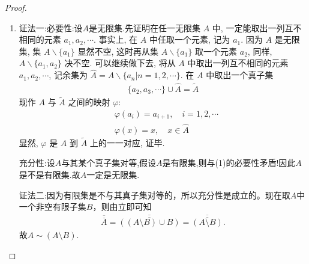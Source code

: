 \documentclass[../../main.tex]{subfiles}%
\begin{document}
\begin{proof}
\begin{enumerate}[(1)]
\item {\color{blue}证法一:}{\heiti 必要性:}设$A$是无限集.先证明在任一无限集 $A$ 中, 一定能取出一列互不相同的元素 $a_1, a_2, \cdots$. 事实上, 在 $A$ 中任取一个元素, 记为 $a_1$. 因为 $A$ 是无限集, 集 $A\backslash  \{a_1\}$ 显然不空, 这时再从集 $A\backslash  \{a_1\}$ 取一个元素 $a_2$, 同样, $A\backslash  \{a_1, a_2\}$ 决不空. 可以继续做下去, 将从 $A$ 中取出一列互不相同的元素 $a_1, a_2, \cdots$, 记余集为 $\hat{A} = A\backslash  \{a_n | n = 1, 2, \cdots\}$. 在 $A$ 中取出一个真子集
\begin{align*}
\{a_2, a_3, \cdots\} \cup \hat{A} = \tilde{A}
\end{align*}
现作 $A$ 与 $\tilde{A}$ 之间的映射 $\varphi$:
\begin{align*}
&\varphi(a_i) = a_{i + 1}, \quad i = 1, 2, \cdots\\
&\varphi(x) = x, \quad x \in \hat{A}
\end{align*}
显然, $\varphi$ 是 $A$ 到 $\tilde{A}$ 上的一一对应, 证毕. 

{\heiti 充分性:}设$A$与其某个真子集对等,假设$A$是有限集,则与(1)的必要性矛盾!因此$A$是不是有限集.故$A$一定是无限集.

{\color{blue}证法二:}因为有限集是不与其真子集对等的，所以充分性是成立的。现在取\(A\)中一个非空有限子集\(B\)，则由立即可知
\begin{align*}
\overline{\overline{A}}=\overline{\overline{\left( \left( A\setminus B \right) \cup B \right) }}=\overline{\overline{\left( A\setminus B \right) }}.
\end{align*}
故$A\sim \left( A\setminus B \right) $.
\end{enumerate}
\end{proof}
\end{document}
